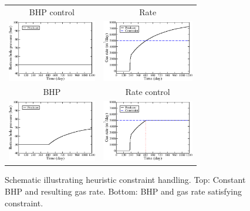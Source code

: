 \begin{figure}[ht]
\begin{center}
  \begin{tabular}{cc}
    BHP control & Rate \\
    \includegraphics[height=2.7cm]{figures/SimpleBHP_BHP.pdf}
    &
    \includegraphics[height=2.7cm]{figures/SimpleBHP_rate_gas.pdf} \\
    BHP & Rate control \\
    \includegraphics[height=2.7cm]{figures/SimpleRate_BHP.pdf}
    &
    \includegraphics[height=2.7cm]{figures/SimpleRate_rate_gas.pdf} \\
  \end{tabular}
\end{center}
     \caption{Schematic illustrating heuristic constraint handling. Top: Constant BHP and resulting gas rate. Bottom: BHP and gas rate satisfying constraint.}
\label{fig:BHPvsRateControl}
\end{figure}


